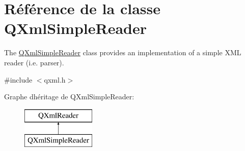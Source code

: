 \hypertarget{class_q_xml_simple_reader}{}\section{Référence de la classe Q\+Xml\+Simple\+Reader}
\label{class_q_xml_simple_reader}


The \hyperlink{class_q_xml_simple_reader}{Q\+Xml\+Simple\+Reader} class provides an implementation of a simple X\+M\+L reader (i.\+e. parser).  




{\ttfamily \#include $<$qxml.\+h$>$}

Graphe d\textquotesingle{}héritage de Q\+Xml\+Simple\+Reader\+:\begin{figure}[H]
\begin{center}
\leavevmode
\includegraphics[height=2.000000cm]{class_q_xml_simple_reader}
\end{center}
\end{figure}
